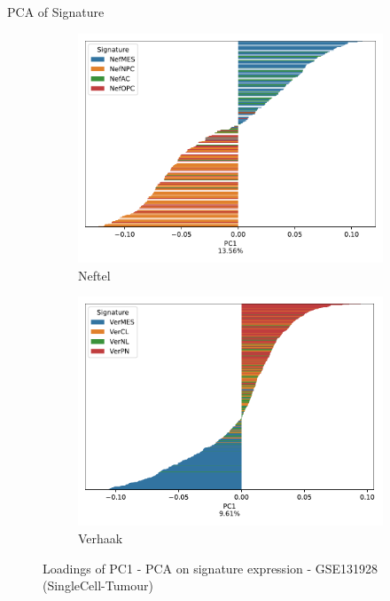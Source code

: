 \documentclass[aspectratio=169,9pt]{beamer}
\begin{document}
    \begin{frame}{PCA of Signature}
        \begin{adjustwidth}{-5cm}{-5cm}
            \centering
            \begin{figure}\ContinuedFloat
                \centering
                \begin{subfigure}[c]{0.48\textwidth}
                    \centering
                    \includegraphics[width=\textwidth]{GSM3828672_loadings_barplot_Nef}
                    \caption{Neftel}
                \end{subfigure}
                \begin{subfigure}[c]{0.48\textwidth}
                    \centering
                    \includegraphics[width=\textwidth]{GSM3828672_loadings_barplot_Ver}
                    \caption{Verhaak}
                \end{subfigure}
                \caption{Loadings of PC1 - PCA on signature expression - GSE131928 (SingleCell-Tumour)}
            \end{figure}
        \end{adjustwidth}
    \end{frame}
\end{document}
